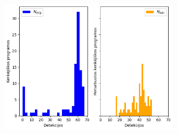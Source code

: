 \begin{figure}[h]
\begin{small}
\begin{center}
\begin{subfigure}[t]{0.48\textwidth}
                \includegraphics[width=\textwidth]{img/det_distributions.png}
            \end{subfigure}
        \end{center}
    \end{small}
\end{figure}